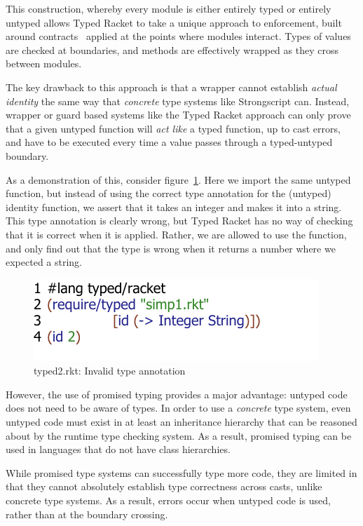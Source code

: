 \documentclass[a4paper,USenglish]{tex/lipics-v2016}
\begin{document}
This construction, whereby every module is either entirely typed or entirely
untyped allows Typed Racket to take a unique approach to enforcement, built
around contracts~\cite{tf-popl08} applied at the points where modules
interact. Types of values are checked at boundaries, and methods are
effectively wrapped as they cross between modules.

The key drawback to this approach is that a wrapper cannot establish
\emph{actual identity} the same way that \emph{concrete} type systems like
Strongscript can. Instead, wrapper or guard based systems like the Typed
Racket approach can only prove that a given untyped function will \emph{act
  like} a typed function, up to cast errors, and have to be executed every
time a value passes through a typed-untyped boundary.

As a demonstration of this, consider figure~\ref{fig:tr2}. Here we import
the same untyped function, but instead of using the correct type annotation
for the (untyped) identity function, we assert that it takes an integer and
makes it into a string. This type annotation is clearly wrong, but Typed
Racket has no way of checking that it is correct when it is applied. Rather,
we are allowed to use the  function, and only find out that the type
is wrong when it returns a number where we expected a string.

\begin{figure}[h]
\includegraphics{figures/typed-rkt2.pdf}
\caption{typed2.rkt: Invalid type annotation}
\label{fig:tr2}
\end{figure}

However, the use of promised typing provides a major advantage: untyped code
does not need to be aware of types. In order to use a \emph{concrete} type
system, even untyped code must exist in at least an inheritance hierarchy
that can be reasoned about by the runtime type checking system. As a result,
promised typing can be used in languages that do not have class hierarchies.

While promised type systems can successfully type more code, they are
limited in that they cannot absolutely establish type correctness across
casts, unlike concrete type systems. As a result, errors occur when untyped
code is used, rather than at the boundary crossing.
\end{document}
